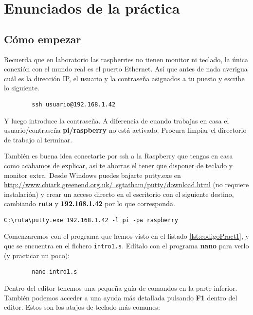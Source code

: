 \section{Enunciados de la práctica}

\subsection{Cómo empezar}

Recuerda que en laboratorio las raspberries no tienen
monitor ni teclado, la única conexión con el mundo real
es el puerto Ethernet. Así que antes de nada averigua cuál es la
dirección IP, el usuario y la contraseña asignados a tu puesto
y escribe lo siguiente.

\begin{lstlisting}
        ssh usuario@192.168.1.42
\end{lstlisting}

Y luego introduce la contraseña. A diferencia de cuando trabajas en casa
el usuario/contraseña {\bf pi/raspberry} no está activado. Procura limpiar
el directorio de trabajo al terminar.

También es buena idea conectarte por ssh a la Raspberry que tengas en casa
como acabamos de explicar, así te ahorras el tener que disponer de teclado
y monitor extra. Desde Windows puedes bajarte putty.exe 
en \newline
\textcolor{blue}{
  \href{http://www.chiark.greenend.org.uk/~sgtatham/putty/download.html}
  {http://www.chiark.greenend.org.uk/~sgtatham/putty/download.html}}
(no requiere instalación) y crear un acceso directo en el escritorio con
el siguiente destino, cambiando {\bf ruta} y {\bf 192.168.1.42} por lo que
corresponda.

\begin{lstlisting}
C:\ruta\putty.exe 192.168.1.42 -l pi -pw raspberry
\end{lstlisting}

Comenzaremos con el programa que hemos visto en el listado
\ref{lst:codigoPract1}, y que se encuentra en el fichero {\tt intro1.s}.
Edítalo con el programa {\bf nano} para verlo (y practicar un poco):

\begin{lstlisting}
        nano intro1.s
\end{lstlisting}

Dentro del editor tenemos una pequeña guía de comandos en la parte
inferior. También podemos acceder a una ayuda más detallada pulsando {\bf F1}
dentro del editor. Estos son los atajos de teclado más comunes:

